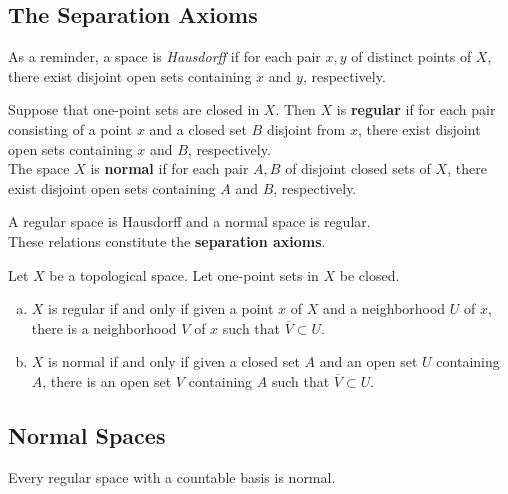 \subsection{The Separation Axioms}

As a reminder, a space is \textit{Hausdorff} if for each pair $x, y$ of distinct points of $X$, there exist disjoint 
open sets containing $x$ and $y$, respectively. 

\begin{definition}
Suppose that one-point sets are closed in $X$. Then $X$ is \textbf{regular} if for each pair consisting of a point $x$ and a closed set $B$ disjoint from $x$,
there exist disjoint open sets containing $x$ and $B$, respectively. \\

The space $X$ is \textbf{normal} if for each pair $A, B$ of disjoint closed sets of $X$, there exist disjoint open sets containing $A$ and $B$, respectively.
\end{definition}

\begin{remark}
A regular space is Hausdorff and a normal space is regular. \\

These relations constitute the \textbf{separation axioms}.
\end{remark}

\begin{lemma}
Let $X$ be a topological space. Let one-point sets in $X$ be closed.
\begin{enumerate}[a)]
    \item $X$ is regular if and only if given a point $x$ of $X$ and a neighborhood $U$ of $x$, there is a neighborhood $V$ of $x$ such that $\overline{V} \subset U$.
    \item $X$ is normal if and only if given a closed set $A$ and an open set $U$ containing $A$, there is an open set $V$ containing $A$ such that $\overline{V} \subset U$.
\end{enumerate}
\end{lemma}

\subsection{Normal Spaces}

\begin{theorem}
Every regular space with a countable basis is normal.
\end{theorem}

